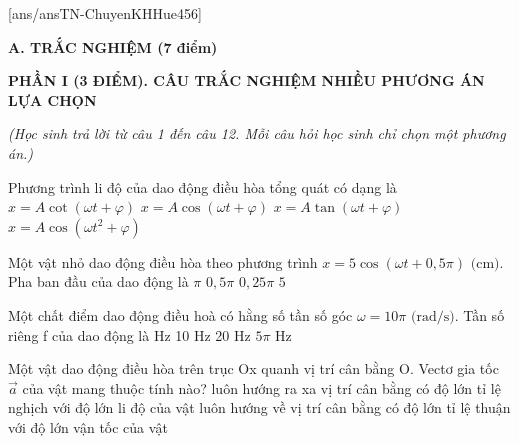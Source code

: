[ans/ansTN-ChuyenKHHue456]

\noindent \textbf{A. TRẮC NGHIỆM (7 điểm)}

\noindent \textbf{PHẦN I (3 ĐIỂM). CÂU TRẮC NGHIỆM NHIỀU PHƯƠNG ÁN LỰA CHỌN}

\noindent \textit{(Học sinh trả lời từ câu 1 đến câu 12. Mỗi câu hỏi học sinh chỉ chọn một phương án.)}
\vspace{0.2cm}

\begin{ex}	Phương trình li độ của dao động điều hòa tổng quát có dạng là
	\choice
	{$x=A \cot (\omega t+\varphi)$}
	{\True $x=A \cos (\omega t+\varphi)$}
	{$x=A \tan (\omega t+\varphi)$}
	{$x=A \cos \left(\omega t^{2}+\varphi\right)$}
\end{ex}

\begin{ex}	Một vật nhỏ dao động điều hòa theo phương trình $x=5 \cos (\omega t+0,5 \pi)\text{ (cm)}$. Pha ban đầu của dao động là
	\choice
	{$\pi$}
	{\True $0,5 \pi$}
	{$0,25 \pi$}
	{$5$}
\end{ex}

\begin{ex}	Một chất điểm dao động điều hoà có hằng số tần số góc $\omega=10 \pi\text{ (rad/s)}$. Tần số riêng f của dao động là
	\choice
	{ Hz}
	{10 Hz}
	{20 Hz}
	{$5\pi\text{ Hz}$}
\end{ex}

\begin{ex}	Một vật dao động điều hòa trên trục Ox quanh vị trí cân bằng O. Vectơ gia tốc $\vec{a}$ của vật mang thuộc tính nào?
	\choice
	{luôn hướng ra xa vị trí cân bằng}
	{có độ lớn tỉ lệ nghịch với độ lớn li độ của vật}
	{\True luôn hướng về vị trí cân bằng}
	{có độ lớn tỉ lệ thuận với độ lớn vận tốc của vật}
\end{ex}


